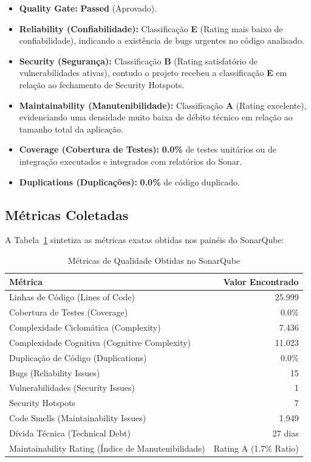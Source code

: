 \documentclass[12pt,a4paper]{article}
\begin{document}
\begin{itemize}
    \item \textbf{Quality Gate:} \textbf{Passed} (Aprovado).
    \item \textbf{Reliability (Confiabilidade):} Classificação \textbf{E} (Rating mais baixo de confiabilidade), indicando a existência de bugs urgentes no código analisado.
    \item \textbf{Security (Segurança):} Classificação \textbf{B} (Rating satisfatório de vulnerabilidades ativas), contudo o projeto recebeu a classificação \textbf{E} em relação ao fechamento de Security Hotspots.
    \item \textbf{Maintainability (Manutenibilidade):} Classificação \textbf{A} (Rating excelente), evidenciando uma densidade muito baixa de débito técnico em relação ao tamanho total da aplicação.
    \item \textbf{Coverage (Cobertura de Testes):} \textbf{0.0\%} de testes unitários ou de integração executados e integrados com relatórios do Sonar.
    \item \textbf{Duplications (Duplicações):} \textbf{0.0\%} de código duplicado.
\end{itemize}

\subsection{Métricas Coletadas}

A Tabela~\ref{tab:metricas} sintetiza as métricas exatas obtidas nos painéis do SonarQube:

\begin{table}[H]
    \centering
    \caption{Métricas de Qualidade Obtidas no SonarQube}
    \label{tab:metricas}
    \begin{tabular}{lr}
        \toprule
        \textbf{Métrica} & \textbf{Valor Encontrado} \\
        \midrule
        Linhas de Código (Lines of Code) & 25.999 \\
        Cobertura de Testes (Coverage) & 0.0\% \\
        Complexidade Ciclomática (Complexity) & 7.436 \\
        Complexidade Cognitiva (Cognitive Complexity) & 11.023 \\
        Duplicação de Código (Duplications) & 0.0\% \\
        Bugs (Reliability Issues) & 15 \\
        Vulnerabilidades (Security Issues) & 1 \\
        Security Hotspots & 7 \\
        Code Smells (Maintainability Issues) & 1.949 \\
        Dívida Técnica (Technical Debt) & 27 dias \\
        Maintainability Rating (Índice de Manutenibilidade) & Rating A (1.7\% Ratio) \\
        \bottomrule
    \end{tabular}
\end{table}
\end{document}

